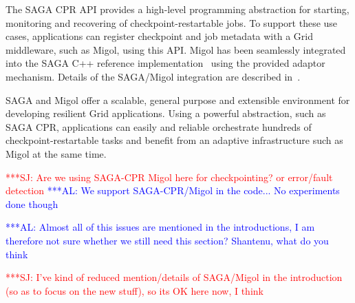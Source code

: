 \documentclass{rspublic}
\newcommand{\alnote}[1]{ {\textcolor{blue} { ***AL: #1 }}}
\newcommand{\jhanote}[1]{ {\textcolor{red} { ***SJ: #1 }}}
\newcommand{\alnote}[1]{}
\newcommand{\jhanote}[1]{}
\begin{document}

The SAGA CPR API provides a high-level programming abstraction for
starting, monitoring and recovering of checkpoint-restartable jobs. To
support these use cases, applications can register checkpoint and job
metadata with a Grid middleware, such as Migol, using this API.
Migol has been seamlessly integrated into the SAGA C++ reference
implementation~\citep{Kaiser:2006qp} using the provided adaptor
mechanism. Details of the SAGA/Migol integration are described
in~\citet{Luckow:2008la}.

SAGA and Migol offer a scalable, general purpose and extensible
environment for developing resilient Grid applications.  Using a
powerful abstraction, such as SAGA CPR, applications can easily and
reliable orchestrate hundreds of checkpoint-restartable tasks and
benefit from an adaptive infrastructure such as Migol at the same
time.

\jhanote{Are we using SAGA-CPR Migol here for checkpointing? or
  error/fault detection} 
\alnote{We support SAGA-CPR/Migol in the code... No experiments done though}  

\alnote{Almost all of this issues are mentioned in the introductions,
  I am therefore not sure whether we still need this section?
  Shantenu, what do you think}

\jhanote{I've kind of reduced mention/details of SAGA/Migol in the
  introduction (so as to focus on the new stuff), so its OK here now,
  I think}
\end{document}
